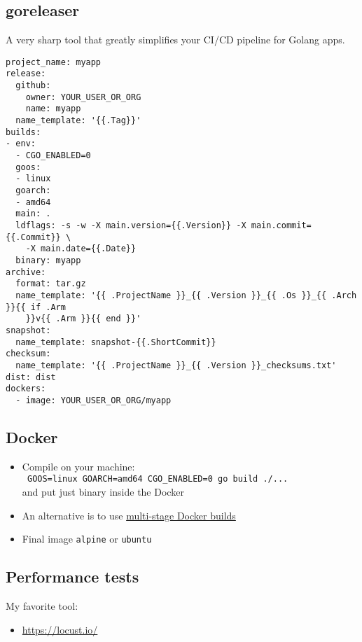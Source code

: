\documentclass[11pt, letterpaper]{article}
\begin{document}
\subsection{goreleaser}

A very sharp tool that greatly simplifies your CI/CD pipeline for Golang apps.

\begin{verbatim}
project_name: myapp
release:
  github:
    owner: YOUR_USER_OR_ORG
    name: myapp
  name_template: '{{.Tag}}'
builds:
- env:
  - CGO_ENABLED=0
  goos:
  - linux
  goarch:
  - amd64
  main: .
  ldflags: -s -w -X main.version={{.Version}} -X main.commit={{.Commit}} \
    -X main.date={{.Date}}
  binary: myapp
archive:
  format: tar.gz
  name_template: '{{ .ProjectName }}_{{ .Version }}_{{ .Os }}_{{ .Arch }}{{ if .Arm
    }}v{{ .Arm }}{{ end }}'
snapshot:
  name_template: snapshot-{{.ShortCommit}}
checksum:
  name_template: '{{ .ProjectName }}_{{ .Version }}_checksums.txt'
dist: dist
dockers:
  - image: YOUR_USER_OR_ORG/myapp
\end{verbatim}

\subsection{Docker}

\begin{itemize}
\item Compile on your machine:\\ \verb| GOOS=linux GOARCH=amd64 CGO_ENABLED=0 go build ./...| \\ and put just binary inside the Docker
\item An alternative is to use \href{https://docs.docker.com/develop/develop-images/multistage-build/}{multi-stage Docker builds}
\item Final image \verb|alpine| or \verb|ubuntu|
\end{itemize}

\subsection{Performance tests}

My favorite tool:

\begin{itemize}
  \item \href{https://locust.io/}{https://locust.io/}
\end{itemize}
\end{document}
